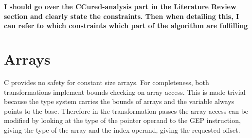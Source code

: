 \textbf{I should go over the CCured-analysis part in the Literature Review section and clearly state the constraints. Then when detailing this, I can refer to which constraints which part of the algorithm are fulfilling}

%
%
%
%
%
%
%

\section{Arrays}

C provides no safety for constant size arrays.
For completeness, both transformations implement bounds checking on array access.
This is made trivial because the type system carries the bounds of arrays and the variable always points to the base. 
Therefore in the transformation passes the array access can be modified by looking at the type of the pointer operand to the GEP instruction, giving the type of the array and the index operand, giving the requested offset.
